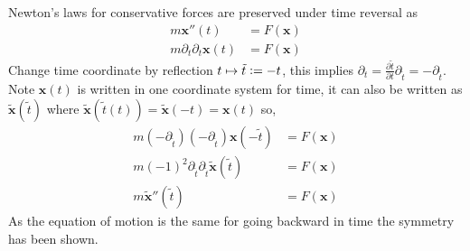Newton's laws for conservative forces are preserved under time reversal as
\begin{align*}
m \mathbf{x}''(t)&=F(\mathbf{x}) \\
m \partial_{t}\partial_{t}\mathbf{x}(t)&=F(\mathbf{x})
\end{align*}
Change time coordinate by reflection $t \mapsto \tilde{t}\vcentcolon=-t$, this implies $\partial_{t}=\frac{\partial \tilde{t}}{\partial t} \partial_{\tilde{t}}=-\partial_{\tilde{t}}$. Note $\mathbf{x}(t)$ is written in one coordinate system for time, it can also be written as $\mathbf{\tilde{x}}(\tilde{t})$ where $\mathbf{\tilde{x}}(\tilde{t}(t))=\mathbf{\tilde{x}}(-t)=\mathbf{x}(t)$ so,
\begin{align*}
m (-\partial_{\tilde{t}})(-\partial_{\tilde{t}})\mathbf{x}(-\tilde{t})&=F(\mathbf{x}) \\
m (-1)^2\partial_{\tilde{t}}\partial_{\tilde{t}}\mathbf{\tilde{x}}(\tilde{t})&=F(\mathbf{x}) \\
m \mathbf{\tilde{x}}''(\tilde{t})&=F(\mathbf{x})
\end{align*}
As the equation of motion is the same for going backward in time the symmetry has been shown.  

